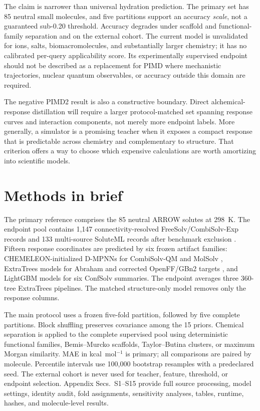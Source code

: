 \documentclass{article}
\begin{document}
The claim is narrower than universal hydration prediction. The primary set has 85
neutral small molecules, and five partitions support an accuracy \emph{scale}, not a
guaranteed sub-0.20 threshold. Accuracy degrades under scaffold and functional-family
separation and on the external cohort. The current model is unvalidated for ions,
salts, biomacromolecules, and substantially larger chemistry; it has no calibrated
per-query applicability score. Its experimentally supervised endpoint should not be
described as a replacement for PIMD where mechanistic trajectories, nuclear quantum
observables, or accuracy outside this domain are required.

The negative PIMD2 result is also a constructive boundary. Direct alchemical-response
distillation will require a larger protocol-matched set spanning response curves and
interaction components, not merely more endpoint labels. More generally, a simulator
is a promising teacher when it exposes a compact response that is predictable across
chemistry and complementary to structure. That criterion offers a way to choose which
expensive calculations are worth amortizing into scientific models.

\section{Methods in brief}

The primary reference comprises the 85 neutral ARROW solutes at 298~K. The endpoint
pool contains 1,147 connectivity-resolved FreeSolv/CombiSolv-Exp records and 133
multi-source SoluteML records after benchmark exclusion
\citep{freesolv2017,combisolvexp2022,soluteml2022}. Fifteen response coordinates are
predicted by six frozen artifact families: CHEMELEON-initialized D-MPNNs for
CombiSolv-QM and MolSolv \citep{chemprop2019}, ExtraTrees models for Abraham and
corrected OpenFF/GBn2 targets \citep{extratrees2006}, and LightGBM models for six
ConfSolv summaries. The endpoint averages three 360-tree ExtraTrees pipelines. The
matched structure-only model removes only the response columns.

The main protocol uses a frozen five-fold partition, followed by five complete
partitions. Block shuffling preserves covariance among the 15 priors. Chemical
separation is applied to the complete supervised pool using deterministic functional
families, Bemis--Murcko scaffolds, Taylor--Butina clusters, or maximum Morgan
similarity. MAE in kcal~mol$^{-1}$ is primary; all comparisons are paired by molecule.
Percentile intervals use 100,000 bootstrap resamples with a predeclared seed. The
external cohort is never used for teacher, feature, threshold, or endpoint selection.
Appendix Secs.~S1--S15 provide full source processing, model settings, identity audit,
fold assignments, sensitivity analyses, tables, runtime, hashes, and molecule-level
results.
\end{document}
